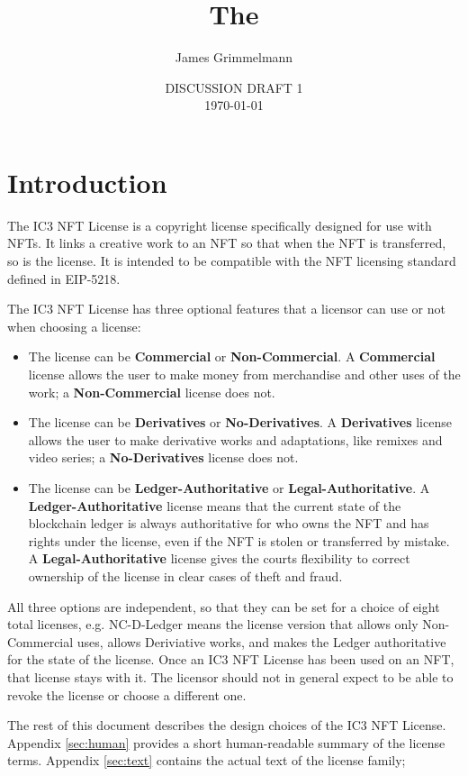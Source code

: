 \documentclass{article}
\title{The \iccclicense\\}
\author{James Grimmelmann}
\affil{Cornell Tech and Cornell Law School\\Institute for Cryptocurrencies and Contracts}
\date{DISCUSSION DRAFT 1\\\today}
\newcommand{\eiplicense}{EIP-5218\xspace}
\newcommand{\iccclicense}{IC3 NFT License\xspace}
\newcommand{\keyword}[1]{\textbf{#1}\xspace}
\newcommand{\commercial}{\keyword{Commercial}}
\newcommand{\noncommercial}{\keyword{Non-Commercial}}
\newcommand{\derivative}{\keyword{Derivatives}}
\newcommand{\noderivative}{\keyword{No-Derivatives}}
\newcommand{\ledger}{\keyword{Ledger-Authoritative}}
\newcommand{\legal}{\keyword{Legal-Authoritative}}
\begin{document}
\maketitle

\tableofcontents

\section{Introduction}

The \iccclicense is a copyright license specifically designed for use with NFTs. It links a creative work to an NFT so that when the NFT is transferred, so is the license. It is intended to be compatible with the NFT licensing standard defined in \eiplicense. 

The \iccclicense has three optional features that a licensor can use or not when choosing a license:
\begin{itemize}
\item The license can be \commercial or \noncommercial. A \commercial license allows the user to make money from merchandise and other uses of the work; a \noncommercial license does not.
\item The license can be \derivative or \noderivative. A \derivative license allows the user to make derivative works and adaptations, like remixes and video series; a \noderivative license does not.
\item The license can be \ledger or \legal. A \ledger license means that the current state of the blockchain ledger is always authoritative for who owns the NFT and has rights under the license, even if the NFT is stolen or transferred by mistake. A \legal license gives the courts flexibility to correct ownership of the license in clear cases of theft and fraud.
\end{itemize}
All three options are independent, so that they can be set for a choice of eight total licenses, e.g. NC-D-Ledger means the license version that allows only Non-Commercial uses, allows Deriviative works, and makes the Ledger authoritative for the state of the license. Once an \iccclicense has been used on an NFT, that license stays with it. The licensor should not in general expect to be able to revoke the license or choose a different one.

The rest of this document describes the design choices of the \iccclicense. Appendix \ref{sec:human} provides a short human-readable summary of the license terms. Appendix \ref{sec:text} contains the actual text of the license family; 
\end{document}
